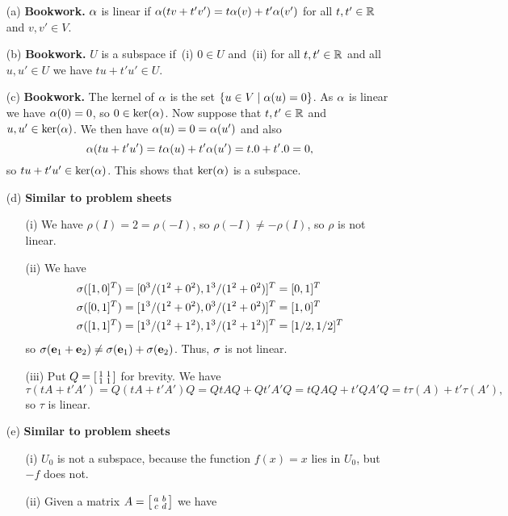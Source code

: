 \documentclass[a4paper]{article}
\begin{document}
\begin{solution}
 \begin{itemize}
  \item[(a)] \textbf{Bookwork.} $\alpha$ is linear if
   $\alpha(tv+t'v')=t\alpha(v)+t'\alpha(v')$ for 
   all $t,t'\in{\mathbb{R}}$ and $v,v'\in V$. 
  \item[(b)] \textbf{Bookwork.} $U$ is a subspace if~(i) $0\in U$
   and~(ii) for all 
   $t,t'\in{\mathbb{R}}$ and all $u,u'\in U$ we have $tu+t'u'\in U$. 
  \item[(c)] \textbf{Bookwork.} The kernel of $\alpha$ is the set
   $\{u\in V\;|\;\alpha(u)=0\}$.\mk
   As $\alpha$ is linear we have $\alpha(0)=0$, so $0\in\ker(\alpha)$.  \mk Now
   suppose that $t,t'\in{\mathbb{R}}$ and $u,u'\in\ker(\alpha)$.  We then have
   $\alpha(u)=0=\alpha(u')$ \mk and also 
   \[ \alpha(tu+t'u') = t\alpha(u)+t'\alpha(u')=t.0+t'.0=0, \]
   so $tu+t'u'\in\ker(\alpha)$.   This shows that $\ker(\alpha)$ is a
   subspace.
  \item[(d)]  \textbf{Similar to problem sheets}
   \begin{itemize}
    \item[(i)] We have $\rho(I)=2=\rho(-I)$, so
     $\rho(-I)\neq-\rho(I)$, so $\rho$ is not linear. 
    \item[(ii)] We have 
     \begin{align*}
      \sigma([1,0]^T) &= [0^3/(1^2+0^2),1^3/(1^2+0^2)]^T = [0,1]^T \\
      \sigma([0,1]^T) &= [1^3/(1^2+0^2),0^3/(1^2+0^2)]^T = [1,0]^T \\
      \sigma([1,1]^T) &= [1^3/(1^2+1^2),1^3/(1^2+1^2)]^T = [1/2,1/2]^T
     \end{align*}
     so $\sigma(\mathbf{e}_1+\mathbf{e}_2)\neq\sigma(\mathbf{e}_1)+\sigma(\mathbf{e}_2)$.  Thus, $\sigma$ is
     not linear. 
    \item[(iii)] Put $Q=\left[\begin{smallmatrix} 1&1\\ 1&1\end{smallmatrix}\right]$ for brevity.  We have 
     \[ \tau(tA+t'A') = 
        Q(tA+t'A')Q = QtAQ+Qt'A'Q = tQAQ + t'QA'Q = 
        t\tau(A) + t'\tau(A'),
     \]
     so $\tau$ is linear. 
   \end{itemize}
  \item[(e)] \textbf{Similar to problem sheets}
   \begin{itemize}
    \item[(i)] $U_0$ is not a subspace, because the function $f(x)=x$
     lies in $U_0$, but $-f$ does not. 
    \item[(ii)] Given a matrix $A=\left[\begin{smallmatrix} a&b\\ c&d\end{smallmatrix}\right]$ we have
     \begin{align*}

\end{align*}
\end{itemize}
\end{itemize}
\end{solution}
\end{document}
